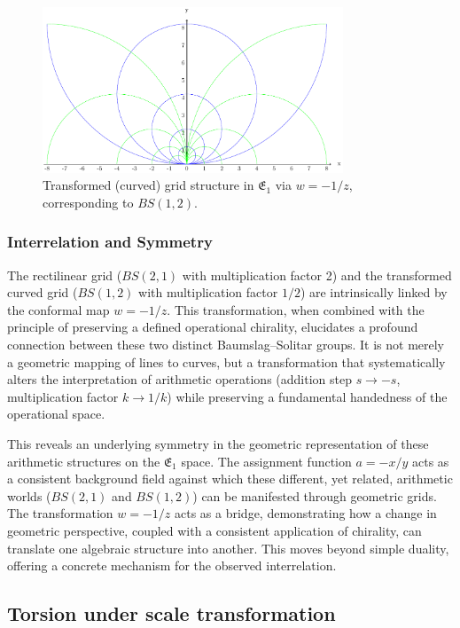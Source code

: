 \begin{figure}[ht]
\centering
\includegraphics[width=0.8\textwidth]{images/18-grid-example-2.pdf}
\caption{Transformed (curved) grid structure in $\mathfrak{E}_1$ via $w=-1/z$, corresponding to $BS(1,2)$.}\label{fig:grid2_revised}
\end{figure}

\subsubsection{Interrelation and Symmetry}
The rectilinear grid ($BS(2,1)$ with multiplication factor 2) and the transformed curved grid ($BS(1,2)$ with multiplication factor $1/2$) are intrinsically linked by the conformal map $w=-1/z$. This transformation, when combined with the principle of preserving a defined operational chirality, elucidates a profound connection between these two distinct Baumslag--Solitar groups. It is not merely a geometric mapping of lines to curves, but a transformation that systematically alters the interpretation of arithmetic operations (addition step $s \to -s$, multiplication factor $k \to 1/k$) while preserving a fundamental handedness of the operational space.

This reveals an underlying symmetry in the geometric representation of these arithmetic structures on the $\mathfrak{E}_1$ space. The assignment function $a=-x/y$ acts as a consistent background field against which these different, yet related, arithmetic worlds ($BS(2,1)$ and $BS(1,2)$) can be manifested through geometric grids. The transformation $w=-1/z$ acts as a bridge, demonstrating how a change in geometric perspective, coupled with a consistent application of chirality, can translate one algebraic structure into another. This moves beyond simple duality, offering a concrete mechanism for the observed interrelation.

\subsection{Torsion under scale transformation}\label{subsec:gridsandtorsion}


